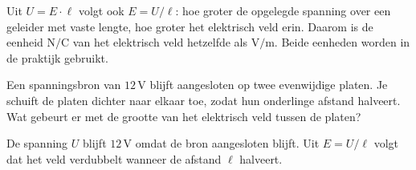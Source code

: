 \documentclass{ximera}
\begin{document}
\begin{remark}[expandable=true,title={Veldsterkte uit spanning}]\nl
Uit $U = E \cdot \ell$ volgt ook $E = U/\ell$: hoe groter de opgelegde spanning over een geleider met vaste lengte, hoe groter het elektrisch veld erin. Daarom is de eenheid $\mathrm{N/C}$ van het elektrisch veld hetzelfde als $\mathrm{V/m}$. Beide eenheden worden in de praktijk gebruikt.
\end{remark}

\begin{question}
    Een spanningsbron van $12 \, \mathrm{V}$ blijft aangesloten op twee evenwijdige platen. Je schuift de platen dichter naar elkaar toe, zodat hun onderlinge afstand halveert. Wat gebeurt er met de grootte van het elektrisch veld tussen de platen?

    \begin{multipleChoice}
    \end{multipleChoice}

    \begin{solution}\nl
        De spanning $U$ blijft $12 \, \mathrm{V}$ omdat de bron aangesloten blijft. Uit $E = U/\ell$ volgt dat het veld verdubbelt wanneer de afstand $\ell$ halveert.
    \end{solution}
\end{question}
\end{document}
